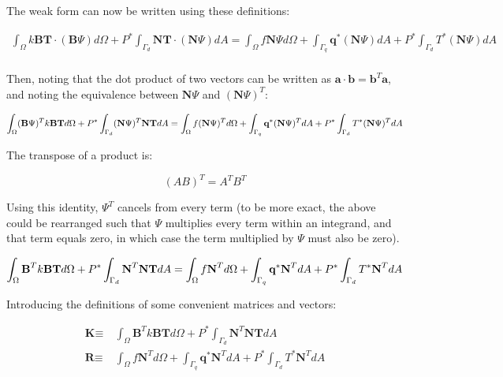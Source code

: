 \documentclass[10pt]{article}
\begin{document}
The weak form can now be written using these definitions:

\begin{equation}
\label{eq:WeakFormQ3}
\begin{aligned}
\int_{\Omega}k\textbf{B}\textbf{T}\cdot(\textbf{B}\Psi) d\Omega+P^{*}\int_{\Gamma_d}\textbf{N}\textbf{T}\cdot(\textbf{N}\Psi)dA=\int_{\Omega}f\textbf{N}\Psi d\Omega+\int_{\Gamma_q}\textbf{q}^{*}(\textbf{N}\Psi) dA+P^{*}\int_{\Gamma_d}T^{*}(\textbf{N}\Psi) dA\\
\end{aligned}
\end{equation}

Then, noting that the dot product of two vectors can be written as \(\textbf{a}\cdot\textbf{b}=\textbf{b}^T\textbf{a}\), and noting the equivalence between \(\textbf{N}\Psi\) and \((\textbf{N}\Psi)^T\):

\begin{equation}
\int_{\Omega}(\textbf{B}\Psi)^Tk\textbf{B}\textbf{T} d\Omega+P^{*}\int_{\Gamma_d}(\textbf{N}\Psi)^T\textbf{N}\textbf{T}dA=\int_{\Omega}f(\textbf{N}\Psi)^T d\Omega+\int_{\Gamma_q}\textbf{q}^{*}(\textbf{N}\Psi)^T dA+P^{*}\int_{\Gamma_d}T^{*}(\textbf{N}\Psi)^T dA\\
\end{equation}

The transpose of a product is:

\begin{equation}
(AB)^T=A^TB^T
\end{equation}

Using this identity, \(\Psi^T\) cancels from every term (to be more exact, the above could be rearranged such that \(\Psi\) multiplies every term within an integrand, and that term equals zero, in which case the term multiplied by \(\Psi\) must also be zero). 

\begin{equation}
\int_{\Omega}\textbf{B}^Tk\textbf{B}\textbf{T} d\Omega+P^{*}\int_{\Gamma_d}\textbf{N}^T\textbf{N}\textbf{T}dA=\int_{\Omega}f\textbf{N}^T d\Omega+\int_{\Gamma_q}\textbf{q}^{*}\textbf{N}^T dA+P^{*}\int_{\Gamma_d}T^{*}\textbf{N}^T dA\\
\end{equation}

Introducing the definitions of some convenient matrices and vectors:

\begin{equation}
\label{eq:TotalDomain}
\begin{aligned}
\textbf{K}\equiv&\ \int_{\Omega}\textbf{B}^Tk\textbf{B}\textbf{T} d\Omega+P^{*}\int_{\Gamma_d}\textbf{N}^T\textbf{N}\textbf{T}dA\\
\textbf{R}\equiv&\ \int_{\Omega}f\textbf{N}^T d\Omega+\int_{\Gamma_q}\textbf{q}^{*}\textbf{N}^T dA+P^{*}\int_{\Gamma_d}T^{*}\textbf{N}^T dA\\
\end{aligned}
\end{equation}
\end{document}

